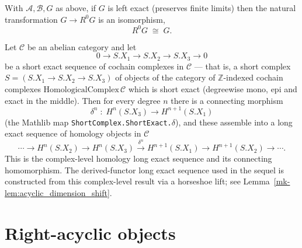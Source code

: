 \begin{lemma}
  \label{mk-lem:right_derived_zero_iso_self}
  \mathlibok

  With \(\mathcal{A}, \mathcal{B}, G\) as above, if \(G\) is left exact (preserves
  finite limits) then the natural transformation \(G \to R^0 G\) is an isomorphism,
  \[
    R^0 G \;\cong\; G.
  \]
\end{lemma}

\begin{lemma}
  \label{mk-lem:homology_long_exact_sequence}
  \mathlibok

  Let \(\mathcal{C}\) be an abelian category and let
  \[
    0 \longrightarrow S.X_1 \longrightarrow S.X_2 \longrightarrow S.X_3
      \longrightarrow 0
  \]
  be a short exact sequence of cochain complexes in \(\mathcal{C}\) --- that is, a
  short complex \(S = (S.X_1 \to S.X_2 \to S.X_3)\) of objects of the category of
  \(\mathbb{Z}\)-indexed cochain complexes \(\mathrm{HomologicalComplex}\,\mathcal{C}\)
  which is short exact (degreewise mono, epi and exact in the middle). Then for every
  degree \(n\) there is a connecting morphism
  \[
    \delta^n \;:\; H^n(S.X_3) \longrightarrow H^{n+1}(S.X_1)
  \]
  (the Mathlib map \texttt{ShortComplex.ShortExact.\(\delta\)}), and these assemble
  into a long exact sequence of homology objects in \(\mathcal{C}\)
  \[
    \cdots \longrightarrow H^n(S.X_2) \longrightarrow H^n(S.X_3)
      \xrightarrow{\ \delta^n\ } H^{n+1}(S.X_1)
      \longrightarrow H^{n+1}(S.X_2) \longrightarrow \cdots .
  \]
  This is the complex-level homology long exact sequence and its connecting
  homomorphism. The derived-functor long exact sequence used in the sequel is
  constructed from this complex-level result via a horseshoe lift; see
  Lemma~\ref{mk-lem:acyclic_dimension_shift}.
\end{lemma}

\section{Right-acyclic objects}

